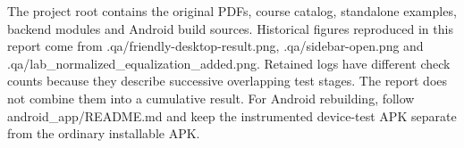 The project root contains the original PDFs, course catalog, standalone examples, backend modules and Android build sources. Historical figures reproduced in this report come from .qa/friendly-desktop-result.png, .qa/sidebar-open.png and .qa/lab\_normalized\_equalization\_added.png. Retained logs have different check counts because they describe successive overlapping test stages. The report does not combine them into a cumulative result. For Android rebuilding, follow android\_app/README.md and keep the instrumented device-test APK separate from the ordinary installable APK.